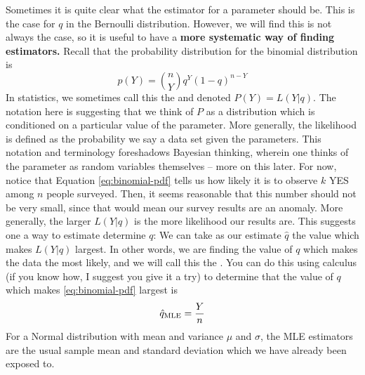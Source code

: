 Sometimes it is quite clear what the estimator for a parameter should be. This is the case for $q$ in the Bernoulli distribution. However, we will find this is not always the case, so it is useful to have a {\bf more systematic way of finding estimators.} 
Recall that the probability distribution for the binomial distribution is 
\begin{equation}\label{eq:binomial-pdf}
p(Y) = {n \choose Y}q^Y(1-q)^{n-Y}
\end{equation}
In statistics, we sometimes call this the  and denoted $P(Y) = L(Y|q)$. The notation here is suggesting that we think of $P$ as a distribution which is conditioned on a particular value of the parameter.  More generally, the likelihood is defined as the probability we say a data set given the parameters. This notation and terminology foreshadows Bayesian thinking, wherein one thinks of the parameter as random variables themselves -- more on this later. 
For now, notice that Equation \eqref{eq:binomial-pdf} tells us how likely it is to observe $k$ YES among $n$ people surveyed. Then, it seems reasonable that this number should not be very small, since that would mean our survey results are an anomaly. More generally, the larger $L(Y|q)$ is the more likelihood our results are. This suggests one a way to estimate determine $q$: We can take as our estimate $\hat{q}$ the value which makes $L(Y|q)$ largest. In other words, we are finding the value of $q$ which makes the data the most likely, and we will call this the .
You can do this using calculus (if you know how, I suggest you give it a try) to determine that the value of $q$ which makes \eqref{eq:binomial-pdf} largest is \begin{equation*}
\hat{q}_{\rm MLE} = \frac{Y}{n}
\end{equation*}
For a Normal distribution with mean and variance $\mu$ and $\sigma$, the MLE estimators are the usual sample mean and standard deviation which we have already been exposed to. 

